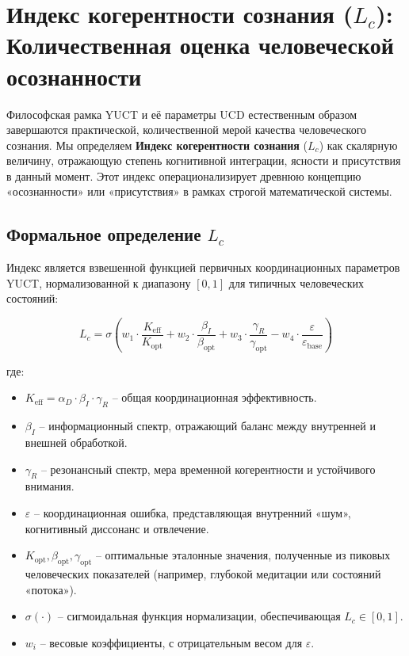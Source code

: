 \documentclass[12pt,a4paper]{article}
\begin{document}
	
	\section{Индекс когерентности сознания (\(L_c\)): Количественная оценка человеческой осознанности}
	
	Философская рамка YUCT и её параметры UCD естественным образом завершаются практической, количественной мерой качества человеческого сознания. Мы определяем \textbf{Индекс когерентности сознания} (\(L_c\)) как скалярную величину, отражающую степень когнитивной интеграции, ясности и присутствия в данный момент. Этот индекс операционализирует древнюю концепцию «осознанности» или «присутствия» в рамках строгой математической системы.
	
	\subsection{Формальное определение \(L_c\)}
	
	Индекс является взвешенной функцией первичных координационных параметров YUCT, нормализованной к диапазону \([0, 1]\) для типичных человеческих состояний:
	
	\begin{equation}
		L_c = \sigma\left( w_1 \cdot \frac{K_{\mathrm{eff}}}{K_{\mathrm{opt}}} + w_2 \cdot \frac{\beta_I}{\beta_{\mathrm{opt}}} + w_3 \cdot \frac{\gamma_R}{\gamma_{\mathrm{opt}}} - w_4 \cdot \frac{\varepsilon}{\varepsilon_{\mathrm{base}}} \right)
	\end{equation}
	
	где:
	\begin{itemize}
		\item \(K_{\mathrm{eff}} = \alpha_D \cdot \beta_I \cdot \gamma_R\) – общая координационная эффективность.
		\item \(\beta_I\) – информационный спектр, отражающий баланс между внутренней и внешней обработкой.
		\item \(\gamma_R\) – резонансный спектр, мера временной когерентности и устойчивого внимания.
		\item \(\varepsilon\) – координационная ошибка, представляющая внутренний «шум», когнитивный диссонанс и отвлечение.
		\item \(K_{\mathrm{opt}}, \beta_{\mathrm{opt}}, \gamma_{\mathrm{opt}}\) – оптимальные эталонные значения, полученные из пиковых человеческих показателей (например, глубокой медитации или состояний «потока»).
		\item \(\sigma(\cdot)\) – сигмоидальная функция нормализации, обеспечивающая \(L_c \in [0, 1]\).
		\item \(w_i\) – весовые коэффициенты, с отрицательным весом для \(\varepsilon\).
	\end{itemize}
	
\end{document}
